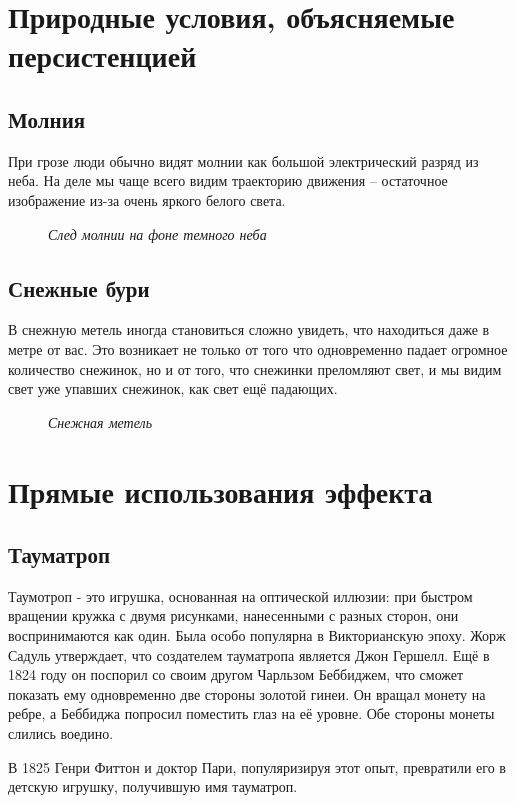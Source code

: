 \documentclass[a4paper, 12pt]{article}
\newcommand{\image}[3]{
	\begin{figure}[ht]
		\center{\texttt{[image: img/\#1]} }
		\caption{\textit{#3}}\end{figure}
}
\begin{document}
\newpage

\section{Природные условия, объясняемые персистенцией}

\subsection{Молния}

При грозе люди обычно видят молнии как большой электрический
разряд из неба. На деле мы чаще всего видим траекторию движения –
остаточное изображение из-за очень яркого белого света.

\image{Гроза.jpg}{200}{След молнии на фоне темного неба}

\subsection{Снежные бури}
В снежную метель иногда становиться сложно увидеть, что
находиться даже в метре от вас. Это возникает не только от того что
одновременно падает огромное количество снежинок, но и от того, что
снежинки преломляют свет, и мы видим свет уже упавших снежинок,
как свет ещё падающих.

\image{Снег.png}{200}{Снежная метель}

\newpage

\section{Прямые использования эффекта}
\subsection{Тауматроп}

Таумотроп - это игрушка, основанная на оптической иллюзии: при
быстром вращении кружка с двумя рисунками, нанесенными с разных сторон,
они воспринимаются как один. Была особо популярна в Викторианскую эпоху.
Жорж Садуль утверждает, что создателем тауматропа является Джон
Гершелл. Ещё в 1824 году он поспорил со своим другом Чарльзом Беббиджем,
что сможет показать ему одновременно две стороны золотой гинеи. Он
вращал монету на ребре, а Беббиджа попросил поместить глаз на её уровне.
Обе стороны монеты слились воедино.

В 1825 Генри Фиттон и доктор Пари, популяризируя этот опыт, превратили
его в детскую игрушку, получившую имя тауматроп.
\end{document}
